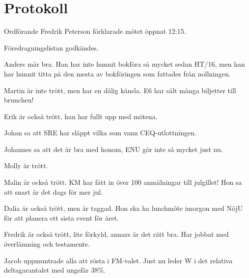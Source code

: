 \documentclass[10pt]{article}
\def\mo{Fredrik Peterson}
\begin{document}
\section*{Protokoll}
\begin{paragrafer}
Ordförande {\mo} förklarade mötet öppnat 12:15.

{\valavmo}

{\valavms}

{\tosg}

{\ingaadj}

{\valavj}

Föredragningslistan godkändes.

\ingaprot

\begin{fyllnadsval} %
\end{fyllnadsval}

\begin{paragrafer}
Anders mår bra. Han har inte hunnit bokföra så mycket sedan HT/16, men han har hunnit titta på den mesta av bokföringen som fattades från nollningen.

Martin är inte trött, men har en dålig känsla. E6 har sålt många biljetter till brunchen!

Erik är också trött, han har fullt upp med mötena.

Johan sa att SRE har släppt vilka som vann CEQ-utlottningen.

Johannes sa att det är bra med honom, ENU gör inte så mycket just nu.

Molly är trött.

Malin är också trött. KM har fått in över 100 anmälningar till julgillet! Hon sa att snart är det dags för mer jul.

Dalia är också trött, men är taggad. Hon ska ha lunchmöte imorgon med NöjU för att planera ett sista event för året.

Fredrik är också trött, lite förkyld, annars är det rätt bra. Har jobbat med överlämning och testamente.

Jacob uppmuntrade alla att rösta i FM-valet. Just nu leder W i det relativa deltagarantalet med ungefär 38\%.


\end{paragrafer}
\end{paragrafer}
\end{document}
